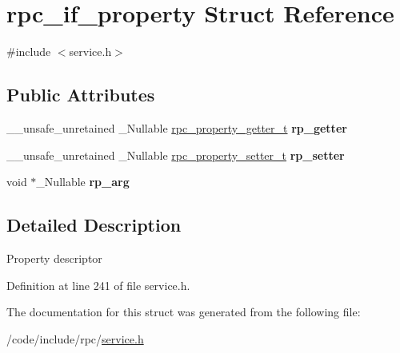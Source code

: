 \hypertarget{structrpc__if__property}{}\section{rpc\+\_\+if\+\_\+property Struct Reference}
\label{structrpc__if__property}


{\ttfamily \#include $<$service.\+h$>$}

\subsection*{Public Attributes}
\begin{DoxyCompactItemize}
\item 
\mbox{\label{structrpc__if__property_ae19b459a98e396cb5f6f8e4938d6c018}} 
\+\_\+\+\_\+unsafe\+\_\+unretained \+\_\+\+Nullable \hyperlink{service_8h_ab438f0c33f3f3876f1c9a23d62134f16}{rpc\+\_\+property\+\_\+getter\+\_\+t} {\bfseries rp\+\_\+getter}
\item 
\mbox{\label{structrpc__if__property_a45fe384e6ad2355ba81781fe16b9d421}} 
\+\_\+\+\_\+unsafe\+\_\+unretained \+\_\+\+Nullable \hyperlink{service_8h_aa8b38d8ab3bafe79a96edaebafe13b8d}{rpc\+\_\+property\+\_\+setter\+\_\+t} {\bfseries rp\+\_\+setter}
\item 
\mbox{\label{structrpc__if__property_a81d2953a7a4bdff1775330c29992546b}} 
void $\ast$\+\_\+\+Nullable {\bfseries rp\+\_\+arg}
\end{DoxyCompactItemize}


\subsection{Detailed Description}
Property descriptor 

Definition at line 241 of file service.\+h.



The documentation for this struct was generated from the following file\+:\begin{DoxyCompactItemize}
\item 
/code/include/rpc/\hyperlink{service_8h}{service.\+h}\end{DoxyCompactItemize}
